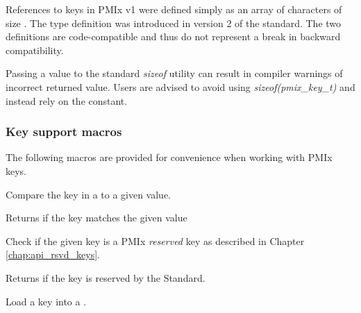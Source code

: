 \adviceuserstart
References to keys in \ac{PMIx} v1 were defined simply as an array of characters of size . The  type definition was introduced in version 2 of the standard. The two definitions are code-compatible and thus do not represent a break in backward compatibility.

Passing a  value to the standard \textit{sizeof} utility can result in compiler warnings of incorrect returned value. Users are advised to avoid using \textit{sizeof(pmix_key_t)} and instead rely on the  constant.
\adviceuserend

\subsubsection{Key support macros}

The following macros are provided for convenience when working with \ac{PMIx} keys.


Compare the key in a  to a given value.


\begin{arglist}
\end{arglist}

Returns  if the key matches the given value


Check if the given key is a \ac{PMIx} \emph{reserved} key as described in Chapter \ref{chap:api_rsvd_keys}.


\begin{arglist}
\end{arglist}

Returns  if the key is reserved by the Standard.


Load a key into a .

